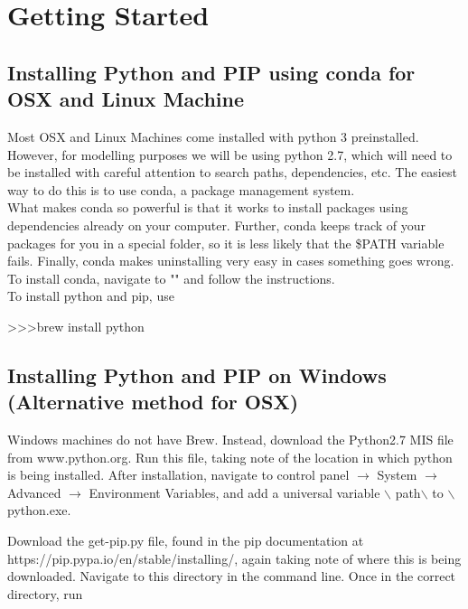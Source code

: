 \chapter{Getting Started}

\section{Installing Python and PIP using conda for OSX and Linux Machine}

Most OSX and Linux Machines come installed with python 3 preinstalled. However, for modelling purposes we will be using python 2.7, which will need to be installed with careful attention to search paths, dependencies, etc. The easiest way to do this is to use conda, a package management system.\\

What makes conda so powerful is that it works to install packages using dependencies already on your computer. Further, conda keeps track of your packages for you in a special folder, so it is less likely that the \$PATH variable fails. Finally, conda makes uninstalling very easy in cases something goes wrong. To install conda, navigate to "" and follow the instructions.\\

To install python and pip, use \\

\begin{mdframed}
\textgreater \textgreater\textgreater \quad brew install python
\end{mdframed}

\section{Installing Python and PIP on Windows (Alternative method for OSX)}

Windows machines do not have Brew. Instead, download the Python2.7 MIS file from www.python.org. Run this file, taking note of the location in which python is being installed. After installation, navigate to control panel $\rightarrow$ System $\rightarrow$ Advanced $\rightarrow$ Environment Variables, and add a universal variable $\backslash$ path$\backslash$ to $\backslash$ python.exe.

Download the get-pip.py file, found in the pip documentation at \\ https://pip.pypa.io/en/stable/installing/, again taking note of where this is being downloaded. Navigate to this directory in the command line. Once in the correct directory, run \\

